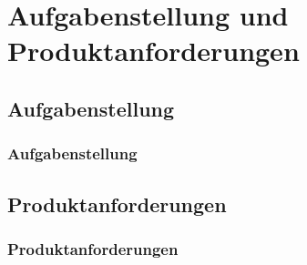 \section{Aufgabenstellung und Produktanforderungen} %
\subsection{Aufgabenstellung}
\begin{frame}
    \frametitle{Aufgabenstellung}
\end{frame}
\subsection{Produktanforderungen}
\begin{frame}
    \frametitle{Produktanforderungen}
\end{frame}
